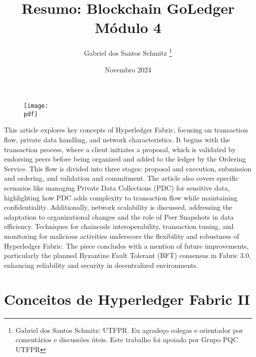 \documentclass[letterpaper,11pt,leqno]{article}
\newcommand{\pdf}{figures/figures}
\begin{document}
\begin{figure}[t]
	{\texttt{[image: \\pdf]}}
	\vspace{-50pt}
	\label{f:logo}\end{figure}

\title{Resumo: Blockchain GoLedger Módulo 4}

\author{Gabriel dos Santos Schmitz
	\thanks{Gabriel dos Santos Schmitz: UTFPR. Eu agradeço colegas e orientador
		por comentários e discussões úteis. Este trabalho foi apoiado por Grupo PQC
		UTFPR}}

\date{Novembro 2024}


\begin{titlepage}

	\maketitle

	This article explores key concepts of Hyperledger Fabric, focusing on
	transaction flow, private data handling, and network characteristics. It
	begins with the transaction process, where a client initiates a proposal,
	which is validated by endorsing peers before being organized and added to the
	ledger by the Ordering Service. This flow is divided into three stages:
	proposal and execution, submission and ordering, and validation and
	commitment. The article also covers specific scenarios like managing Private
	Data Collections (PDC) for sensitive data, highlighting how PDC adds
	complexity to transaction flow while maintaining confidentiality.
	Additionally, network scalability is discussed, addressing the adaptation to
	organizational changes and the role of Peer Snapshots in data efficiency.
	Techniques for chaincode interoperability, transaction tuning, and monitoring
	for malicious activities underscore the flexibility and robustness of
	Hyperledger Fabric. The piece concludes with a mention of future improvements,
	particularly the planned Byzantine Fault Tolerant (BFT) consensus in Fabric
	3.0, enhancing reliability and security in decentralized environments.

\end{titlepage}

\section{Conceitos de Hyperledger Fabric II}
\end{document}
